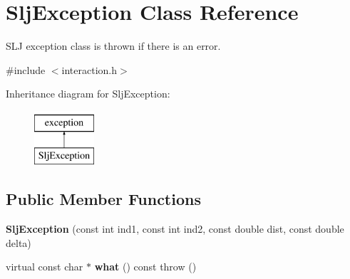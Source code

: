 \hypertarget{classSljException}{\section{Slj\-Exception Class Reference}
\label{classSljException}
}


S\-L\-J exception class is thrown if there is an error.  




{\ttfamily \#include $<$interaction.\-h$>$}

Inheritance diagram for Slj\-Exception\-:\begin{figure}[H]
\begin{center}
\leavevmode
\includegraphics[height=2.000000cm]{classSljException}
\end{center}
\end{figure}
\subsection*{Public Member Functions}
\begin{DoxyCompactItemize}
\item 
\hypertarget{classSljException_a844c40d1317e90d796cc5224d6bf9f5b}{{\bfseries Slj\-Exception} (const int ind1, const int ind2, const double dist, const double delta)}\label{classSljException_a844c40d1317e90d796cc5224d6bf9f5b}

\item 
\hypertarget{classSljException_a1e5587bb78df07885ce111a7e6d4295a}{virtual const char $\ast$ {\bfseries what} () const   throw ()}\label{classSljException_a1e5587bb78df07885ce111a7e6d4295a}

\end{DoxyCompactItemize}
